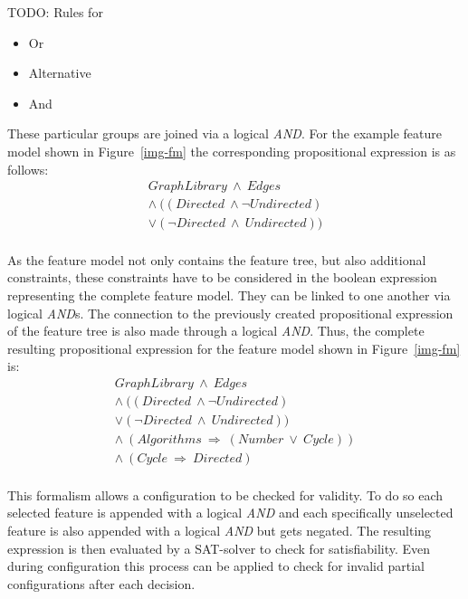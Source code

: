 {\color{red}TODO: Rules for
\begin{itemize}
	\item Or
	\item Alternative
	\item And
\end{itemize}
}
These particular groups are joined via a logical \textit{AND}. For the example feature model shown in Figure~\ref{img-fm} the corresponding propositional expression is as follows:
\begin{equation}
\begin{split}
	GraphLibrary\ \wedge\ Edges\\
	\wedge\ ((Directed\ \wedge \neg Undirected)\\
	\vee (\neg Directed\ \wedge\ Undirected))
\end{split}
\end{equation}\\

As the feature model not only contains the feature tree, but also additional constraints, these constraints have to be considered in the boolean expression representing the complete feature model. They can be linked to one another via logical \textit{AND}s. The connection to the previously created propositional expression of the feature tree is also made through a logical \textit{AND}. Thus, the complete resulting propositional expression for the feature model shown in Figure~\ref{img-fm} is:
\begin{equation}
\begin{split}
	GraphLibrary\ \wedge\ Edges\\
	\wedge\ ((Directed\ \wedge \neg Undirected)\\
	\vee (\neg Directed\ \wedge\ Undirected))\\
	\wedge\ (Algorithms\ \Rightarrow\ (Number\ \vee\ Cycle))\\
	\wedge\ (Cycle\ \Rightarrow\ Directed)
\end{split}
\end{equation}\\
This formalism allows a configuration to be checked for validity. To do so each selected feature is appended with a logical \textit{AND} and each specifically unselected feature is also appended with a logical \textit{AND} but gets negated. The resulting expression is then evaluated by a SAT-solver to check for satisfiability. Even during configuration this process can be applied to check for invalid partial configurations after each decision.
